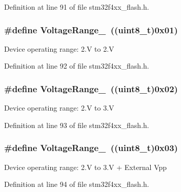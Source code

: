 Definition at line 91 of file stm32f4xx\-\_\-flash.\-h.

\hypertarget{group___f_l_a_s_h___voltage___range_ga4c080832b4c8c992acb645f2c39561e0}{
\subsubsection[{Voltage\-Range\-\_\-2}]{\setlength{\rightskip}{0pt plus 5cm}\#define Voltage\-Range\-\_~((uint8\-\_\-t)0x01)}}\label{group___f_l_a_s_h___voltage___range_ga4c080832b4c8c992acb645f2c39561e0}
Device operating range\-: 2.\-V to 2.\-V 

Definition at line 92 of file stm32f4xx\-\_\-flash.\-h.

\hypertarget{group___f_l_a_s_h___voltage___range_gadd249fb08c69b11cea3a6b7c22865b99}{
\subsubsection[{Voltage\-Range\-\_\-3}]{\setlength{\rightskip}{0pt plus 5cm}\#define Voltage\-Range\-\_~((uint8\-\_\-t)0x02)}}\label{group___f_l_a_s_h___voltage___range_gadd249fb08c69b11cea3a6b7c22865b99}
Device operating range\-: 2.\-V to 3.\-V 

Definition at line 93 of file stm32f4xx\-\_\-flash.\-h.

\hypertarget{group___f_l_a_s_h___voltage___range_ga3197950f6bfefc8b9a784db5439a0498}{
\subsubsection[{Voltage\-Range\-\_\-4}]{\setlength{\rightskip}{0pt plus 5cm}\#define Voltage\-Range\-\_~((uint8\-\_\-t)0x03)}}\label{group___f_l_a_s_h___voltage___range_ga3197950f6bfefc8b9a784db5439a0498}
Device operating range\-: 2.\-V to 3.\-V + External Vpp 

Definition at line 94 of file stm32f4xx\-\_\-flash.\-h.

